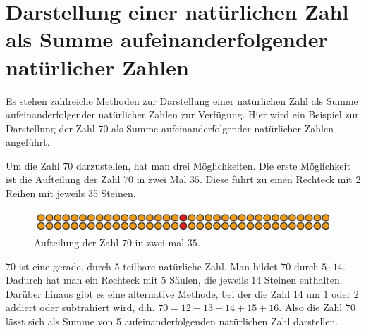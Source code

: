 %
%

\chapter{Darstellung einer natürlichen Zahl als Summe aufeinanderfolgender
natürlicher Zahlen}

Es stehen zahlreiche Methoden zur Darstellung einer natürlichen Zahl
als Summe aufeinanderfolgender natürlicher Zahlen zur Verfügung.
Hier wird ein Beispiel zur Darstellung der Zahl $70$ als Summe
aufeinanderfolgender natürlicher Zahlen angeführt.

Um die Zahl $70$ darzustellen, hat man drei Möglichkeiten.
Die erste Möglichkeit ist die Aufteilung der Zahl $70$ in
zwei Mal $35$. Diese führt zu einen Rechteck mit 2 Reihen
mit jeweils 35 Steinen.

\begin{figure}[H]
  \centering
  \includegraphics[width=.5\linewidth]{./images/muster05.png}
  \caption[]{Aufteilung der Zahl $70$ in zwei mal $35$.}
  \label{fig:muster_70_zweimal_35}
\end{figure}

$70$ ist eine gerade, durch 5 teilbare natürliche Zahl.
Man bildet $70$ durch $5 \cdot 14$.
Dadurch hat man ein Rechteck mit 5 Säulen, die jeweils
14 Steinen enthalten. Darüber hinaus gibt es eine
alternative Methode, bei der die Zahl $14$ um $1$ oder $2$
addiert oder subtrahiert wird, d.h.
$70 = 12 + 13 + 14 + 15 + 16$.
Also die Zahl $70$ lässt sich als Summe von 5 aufeinanderfolgenden
natürlichen Zahl darstellen.
